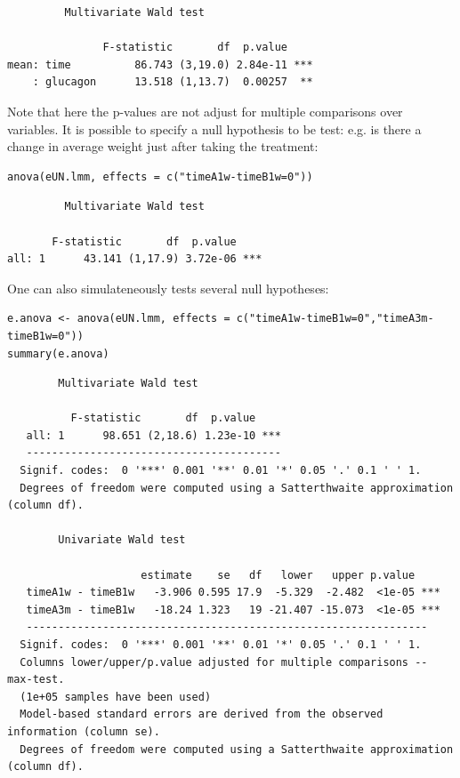 \documentclass[12pt]{article}
\begin{document}
\begin{verbatim}
	     Multivariate Wald test 

               F-statistic       df  p.value    
mean: time          86.743 (3,19.0) 2.84e-11 ***
    : glucagon      13.518 (1,13.7)  0.00257  **
\end{verbatim}


Note that here the p-values are not adjust for multiple comparisons
over variables. It is possible to specify a null hypothesis to be
test: e.g. is there a change in average weight just after taking the
treatment:
\lstset{language=r,label= ,caption= ,captionpos=b,numbers=none}
\begin{lstlisting}
anova(eUN.lmm, effects = c("timeA1w-timeB1w=0"))
\end{lstlisting}

\begin{verbatim}
	     Multivariate Wald test 

       F-statistic       df  p.value    
all: 1      43.141 (1,17.9) 3.72e-06 ***
\end{verbatim}


One can also simulateneously tests several null hypotheses:
\lstset{language=r,label= ,caption= ,captionpos=b,numbers=none}
\begin{lstlisting}
e.anova <- anova(eUN.lmm, effects = c("timeA1w-timeB1w=0","timeA3m-timeB1w=0"))
summary(e.anova)
\end{lstlisting}

\begin{verbatim}
		Multivariate Wald test 

          F-statistic       df  p.value    
   all: 1      98.651 (2,18.6) 1.23e-10 ***
   ---------------------------------------- 
  Signif. codes:  0 '***' 0.001 '**' 0.01 '*' 0.05 '.' 0.1 ' ' 1.
  Degrees of freedom were computed using a Satterthwaite approximation (column df). 

		Univariate Wald test 

                     estimate    se   df   lower   upper p.value    
   timeA1w - timeB1w   -3.906 0.595 17.9  -5.329  -2.482  <1e-05 ***
   timeA3m - timeB1w   -18.24 1.323   19 -21.407 -15.073  <1e-05 ***
   --------------------------------------------------------------- 
  Signif. codes:  0 '***' 0.001 '**' 0.01 '*' 0.05 '.' 0.1 ' ' 1.
  Columns lower/upper/p.value adjusted for multiple comparisons -- max-test.
  (1e+05 samples have been used)
  Model-based standard errors are derived from the observed information (column se). 
  Degrees of freedom were computed using a Satterthwaite approximation (column df).
\end{verbatim}
\end{document}
